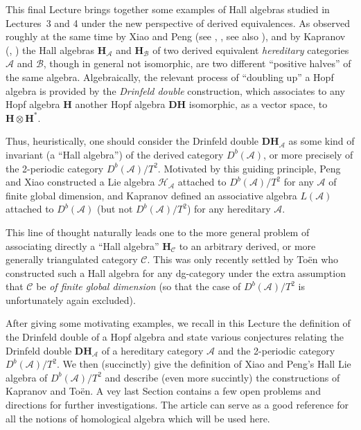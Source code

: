 \documentclass[a4paper,10pt]{amsart}
\def\H{\mathbf{H}}
\def\A{\mathcal{A}}
\numberwithin{equation}{section}
\begin{document}
{\vspace{.2in}

This final Lecture brings together some examples of Hall algebras studied in Lectures~3 and 4
under the new perspective of derived equivalences. As observed roughly at the same time by Xiao and Peng (see \cite{Xiao}, \cite{PX}, see also \cite{P?}), and by Kapranov (\cite{Kap1}, \cite{Kap2}) the Hall algebras $\H_{\A}$ and $\H_{\mathcal{B}}$ of two derived equivalent \textit{hereditary} categories $\A$ and $\mathcal{B}$, though in general not isomorphic, are two different ``positive halves'' of the same algebra. Algebraically, the relevant process of ``doubling up'' a Hopf algebra is provided by the \textit{Drinfeld double} construction, which associates to any Hopf algebra $\H$ another Hopf algebra $\mathbf{DH}$ isomorphic, as a vector space, to $\H \otimes \H^*$.

\vspace{.05in}

Thus, heuristically, one should consider the Drinfeld double $\mathbf{D}\H_{\mathcal{A}}$ as some kind of invariant (a ``Hall algebra'') of the derived category $D^b(\A)$, or more precisely of the 2-periodic category $D^b(\mathcal{A})/T^2$. Motivated by this guiding principle, Peng and Xiao constructed a Lie algebra $\mathcal{H}_\A$ attached to $D^b(\A)/T^2$ for any $\A$ of finite global dimension, and Kapranov defined an associative algebra $L(\A)$ attached to $D^b(\mathcal{A})$ (but not $D^b(\A)/T^2$) for any hereditary $\A$.

\vspace{.05in}

This line of thought naturally leads one to the more general problem of associating directly a ``Hall algebra'' $\H_{\mathcal{C}}$ to an arbitrary derived, or more generally triangulated category $\mathcal{C}$. This was only recently settled by To\"en \cite{Toen} who constructed such a Hall algebra for any dg-category under the extra assumption that $\mathcal{C}$ be \textit{of finite global dimension} (so that the case of $D^b(\A)/T^2$ is unfortunately again excluded).

\vspace{.1in}

After giving some motivating examples, we recall in this Lecture the definition of the Drinfeld double of a Hopf algebra and state various conjectures relating the Drinfeld double $\mathbf{D}\H_{\mathcal{A}}$ of a hereditary category $\mathcal{A}$ and the 2-periodic category $D^b(\mathcal{A})/T^2$. We then (succinctly) give the definition of Xiao and Peng's  Hall Lie algebra of $D^b(\mathcal{A})/T^2$ and describe (even more succintly) the constructions of Kapranov and To\"en. A vey last Section contains a few open problems and directions for further investigations. The article \cite{Keller} can serve as a good reference for all the notions of homological algebra which will be used here.

}
\end{document}
